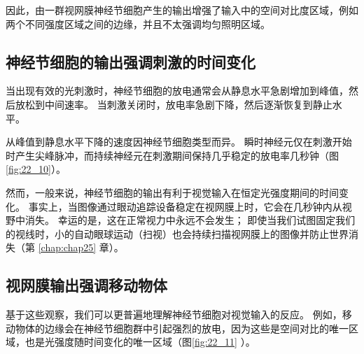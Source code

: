 因此，由一群视网膜神经节细胞产生的输出增强了输入中的空间对比度区域，例如两个不同强度区域之间的边缘，并且不太强调均匀照明区域。


\subsection{神经节细胞的输出强调刺激的时间变化}
当出现有效的光刺激时，神经节细胞的放电通常会从静息水平急剧增加到峰值，然后放松到中间速率。 当刺激关闭时，放电率急剧下降，然后逐渐恢复到静止水平。


从峰值到静息水平下降的速度因神经节细胞类型而异。
瞬时神经元仅在刺激开始时产生尖峰脉冲，而持续神经元在刺激期间保持几乎稳定的放电率几秒钟（图 \ref{fig:22_10}）。


然而，一般来说，神经节细胞的输出有利于视觉输入在恒定光强度期间的时间变化。 
事实上，当图像通过眼动追踪设备稳定在视网膜上时，它会在几秒钟内从视野中消失。 
幸运的是，这在正常视力中永远不会发生； 即使当我们试图固定我们的视线时，小的自动眼球运动（扫视）也会持续扫描视网膜上的图像并防止世界消失（第 \ref{chap:chap25} 章）。

\subsection{视网膜输出强调移动物体}
基于这些观察，我们可以更普遍地理解神经节细胞对视觉输入的反应。 
例如，移动物体的边缘会在神经节细胞群中引起强烈的放电，因为这些是空间对比的唯一区域，也是光强度随时间变化的唯一区域（图\ref{fig:22_11} ）。

